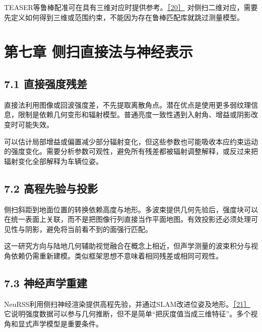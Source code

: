 TEASER等鲁棒配准可在具有三维对应时提供参考。\href{https://arxiv.org/abs/2001.07715}{［20］} 对侧扫二维对应，需要先定义如何得到三维或范围约束，不能因为存在鲁棒匹配库就跳过测量模型。

\hypertarget{ux7b2cux4e03ux7ae0-ux4fa7ux626bux76f4ux63a5ux6cd5ux4e0eux795eux7ecfux8868ux793a}{%
\section{第七章 侧扫直接法与神经表示}\label{ux7b2cux4e03ux7ae0-ux4fa7ux626bux76f4ux63a5ux6cd5ux4e0eux795eux7ecfux8868ux793a}}

\hypertarget{ux76f4ux63a5ux5f3aux5ea6ux6b8bux5dee}{%
\subsection{7.1 直接强度残差}\label{ux76f4ux63a5ux5f3aux5ea6ux6b8bux5dee}}

直接法利用图像或回波强度差，不先提取离散角点。潜在优点是使用更多弱纹理信息，限制是依赖几何变形和辐射模型。普通亮度一致性遇到入射角、增益或阴影改变时可能失效。

可以估计局部增益或偏置减少部分辐射变化，但这些参数也可能吸收本应约束运动的强度变化。需要分析参数可观性，避免所有残差都被辐射调整解释，或反过来把辐射变化全部解释为车辆位姿。

\hypertarget{ux9ad8ux7a0bux5148ux9a8cux4e0eux6295ux5f71}{%
\subsection{7.2 高程先验与投影}\label{ux9ad8ux7a0bux5148ux9a8cux4e0eux6295ux5f71}}

侧扫斜距到地面位置的转换依赖高度与地形。多波束提供几何先验后，强度块可以在统一表面上关联，而不是把图像行列直接当作平面地图。有效投影还必须处理可见性与阴影，避免将当前看不到的面强行匹配。

这一研究方向与陆地几何辅助视觉融合在概念上相近，但声学测量的波束积分与视角依赖仍需重新建模。类似框架思想不意味着相同残差或相同可观性。

\hypertarget{ux795eux7ecfux58f0ux5b66ux91cdux5efa}{%
\subsection{7.3 神经声学重建}\label{ux795eux7ecfux58f0ux5b66ux91cdux5efa}}

NeuRSS利用侧扫神经渲染提供高程先验，并通过SLAM改进位姿及地形。\href{https://arxiv.org/abs/2405.05807}{［21］} 它说明强度数据可以参与几何推断，但不是简单``把灰度值当成三维特征''。多个视角和显式声学模型是重要条件。

